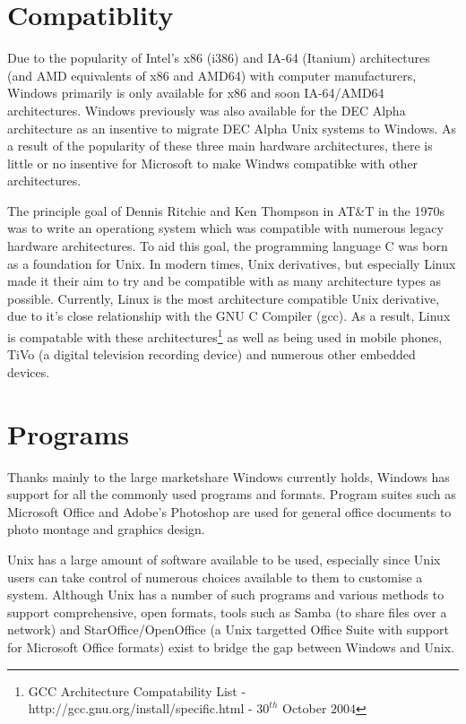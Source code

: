\documentclass[a4paper,10pt]{article}
\begin{document}
\section*{Compatiblity}

Due to the popularity of Intel's x86 (i386) and IA-64 (Itanium)
architectures (and AMD equivalents of x86 and AMD64) with computer 
manufacturers, Windows primarily is only available for x86 and soon
IA-64/AMD64 architectures. Windows previously was also available for
the DEC Alpha architecture as an insentive to migrate DEC Alpha Unix
systems to Windows. As a result of the popularity of these three main 
hardware architectures, there is little or no insentive for Microsoft to
make Windws compatibke with other architectures.

The principle goal of Dennis Ritchie and Ken Thompson in AT\&T in the
1970s was to write an operationg system which was compatible with
numerous legacy hardware architectures. To aid this goal, the
programming language C was born as a foundation for Unix. In modern times,
Unix derivatives, but especially Linux made it their aim to try and be
compatible with as many architecture types as possible. Currently, Linux
is the most architecture compatible Unix derivative, due to it's close
relationship with the GNU C Compiler (gcc). As a result, Linux is
compatable with these architectures\footnote{GCC Architecture
Compatability List - http://gcc.gnu.org/install/specific.html - $30^{th}$
October $2004$} as well as being used in mobile phones, TiVo (a digital
television recording device) and numerous other embedded devices.

\section*{Programs}

Thanks mainly to the large marketshare Windows currently holds, Windows
has support for all the commonly used programs and formats. Program
suites such as Microsoft Office and Adobe's Photoshop are used for
general office documents to photo montage and graphics design.

Unix has a large amount of software available to be used, especially
since Unix users can take control of numerous choices available to them
to customise a system. Although Unix has a number of such programs and
various methods to support comprehensive, open formats, tools such as 
Samba (to share files over a network) and StarOffice/OpenOffice (a Unix
targetted Office Suite with support for Microsoft Office formats) exist
to bridge the gap between Windows and Unix.
\end{document}
